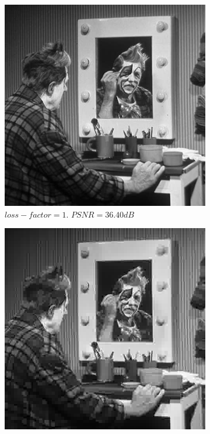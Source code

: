\documentclass[11pt,a4paper]{article}
\begin{document}
\begin{figure}[ht]
	\centering
	\begin{subfigure}[h]{0.4\textwidth}
		\includegraphics[width=\textwidth]{clown_lf1}
		\caption{$loss-factor = 1$. $PSNR = 36.40dB$}
		\label{clown:1}
	\end{subfigure}
	\par\bigskip
	\begin{subfigure}[h]{0.4\textwidth}
		\includegraphics[width=\textwidth]{clown_lf10}

\end{subfigure}
\end{figure}
\end{document}
